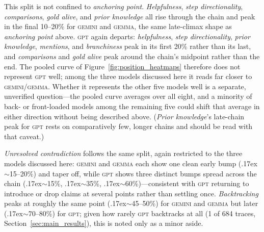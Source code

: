 This split is not confined to \emph{anchoring point}. \emph{Helpfulness},
\emph{step directionality}, \emph{comparisons}, \emph{gold alive}, and
\emph{prior knowledge} all rise through the chain and peak in the final
10--20\% for \textsc{gemini} and \textsc{gemma}, the same late-climax shape as
\emph{anchoring point} above. \textsc{gpt} again departs: \emph{helpfulness},
\emph{step directionality}, \emph{prior knowledge}, \emph{mentions}, and
\emph{branchiness} peak in its first 20\% rather than its last, and
\emph{comparisons} and \emph{gold alive} peak around the chain's midpoint
rather than the end. The pooled curve of
Figure~\ref{fig:position_heatmaps} therefore does not represent
\textsc{gpt} well; among the three models discussed here it reads far closer
to \textsc{gemini}/\textsc{gemma}. Whether it represents the other five
models well is a separate, unverified question---the pooled curve averages
over all eight, and a minority of back- or front-loaded models among the
remaining five could shift that average in either direction without being
described above. (\emph{Prior knowledge}'s late-chain peak for \textsc{gpt}
rests on comparatively few, longer chains and should be read with that
caveat.)

\emph{Unresolved contradiction} follows the same split, again restricted to
the three models discussed here: \textsc{gemini} and \textsc{gemma} each show
one clean early bump (\raise.17ex\hbox{$\scriptstyle\sim$}15--20\%) and taper
off, while \textsc{gpt} shows three distinct bumps spread across the chain
(\raise.17ex\hbox{$\scriptstyle\sim$}15\%, \raise.17ex\hbox{$\scriptstyle\sim$}35\%,
\raise.17ex\hbox{$\scriptstyle\sim$}60\%)---consistent with \textsc{gpt} returning to
introduce or drop claims at several points rather than settling once.
\emph{Backtracking} peaks at roughly the same point
(\raise.17ex\hbox{$\scriptstyle\sim$}45--50\%) for \textsc{gemini} and \textsc{gemma} but later
(\raise.17ex\hbox{$\scriptstyle\sim$}70--80\%) for \textsc{gpt}; given how rarely \textsc{gpt}
backtracks at all (1 of 684 traces, Section~\ref{sec:main_results}), this is
noted only as a minor aside.

\FloatBarrier



